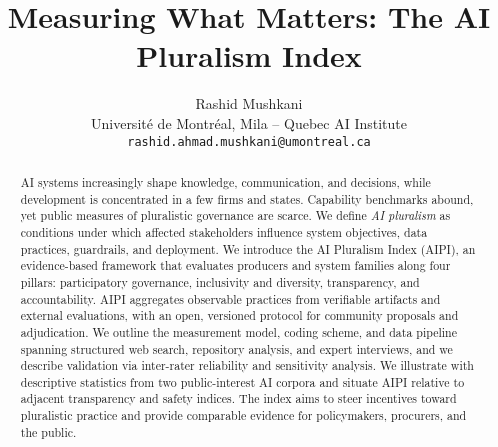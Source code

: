 
\title{Measuring What Matters: The AI Pluralism Index}

\author{
Rashid Mushkani\\
Université de Montréal, Mila – Quebec AI Institute\\
\texttt{rashid.ahmad.mushkani@umontreal.ca}
}



\maketitle

\begin{abstract}
AI systems increasingly shape knowledge, communication, and decisions, while development is concentrated in a few firms and states. Capability benchmarks abound, yet public measures of pluralistic governance are scarce. We define \emph{AI pluralism} as conditions under which affected stakeholders influence system objectives, data practices, guardrails, and deployment. We introduce the AI Pluralism Index (AIPI), an evidence-based framework that evaluates producers and system families along four pillars: participatory governance, inclusivity and diversity, transparency, and accountability. AIPI aggregates observable practices from verifiable artifacts and external evaluations, with an open, versioned protocol for community proposals and adjudication. We outline the measurement model, coding scheme, and data pipeline spanning structured web search, repository analysis, and expert interviews, and we describe validation via inter-rater reliability and sensitivity analysis. We illustrate with descriptive statistics from two public-interest AI corpora and situate AIPI relative to adjacent transparency and safety indices. The index aims to steer incentives toward pluralistic practice and provide comparable evidence for policymakers, procurers, and the public.
\end{abstract}


